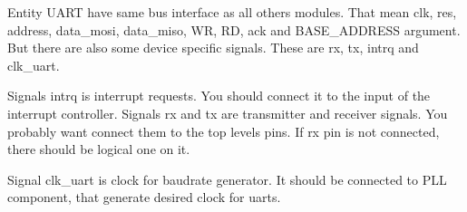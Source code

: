 Entity UART have same bus interface as all others modules. That mean clk, res,
address, data\_mosi, data\_miso, WR, RD, ack and BASE\_ADDRESS argument. But there
are also some device specific signals. These are rx, tx, intrq and clk\_uart.

Signals intrq is interrupt requests. You should connect it to
the input of the interrupt controller. Signals rx and tx are transmitter and
receiver signals. You probably want connect them to the top levels pins. If rx
pin is not connected, there should be logical one on it.

Signal clk\_uart is clock for baudrate generator. It should be connected to PLL
component, that generate desired clock for uarts.
